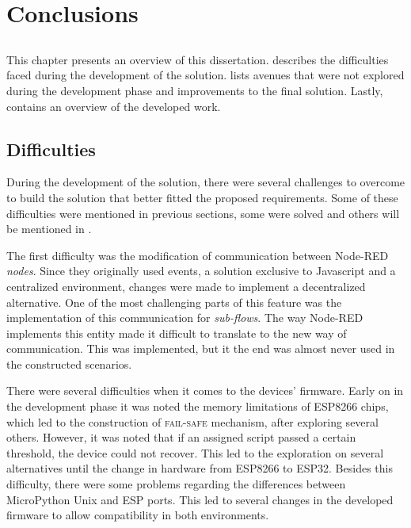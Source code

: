 \chapter{Conclusions} \label{chap:concl}

\section*{}

\minitoc \mtcskip \noindent
This chapter presents an overview of this dissertation.  describes the difficulties faced during the development of the solution.  lists avenues that were not explored during the development phase and improvements to the final solution. Lastly,  contains an overview of the developed work.

\section{Difficulties}\label{sec:difficulties}

During the development of the solution, there were several challenges to overcome to build the solution that better fitted the proposed requirements. Some of these difficulties were mentioned in previous sections, some were solved and others will be mentioned in .

The first difficulty was the modification of communication between Node-RED \textit{nodes}. Since they originally used events, a solution exclusive to Javascript and a centralized environment, changes were made to implement a decentralized alternative. One of the most challenging parts of this feature was the implementation of this communication for \emph{sub-flows}. The way Node-RED implements this entity made it difficult to translate to the new way of communication. This was implemented, but it the end was almost never used in the constructed scenarios.

There were several difficulties when it comes to the devices' firmware. Early on in the development phase it was noted the memory limitations of ESP8266 chips, which led to the construction of \textsc{fail-safe} mechanism, after exploring several others. However, it was noted that if an assigned script passed a certain threshold, the device could not recover. This led to the exploration on several alternatives until the change in hardware from ESP8266 to ESP32. Besides this difficulty, there were some problems regarding the differences between MicroPython Unix and ESP ports. This led to several changes in the developed firmware to allow compatibility in both environments. 


